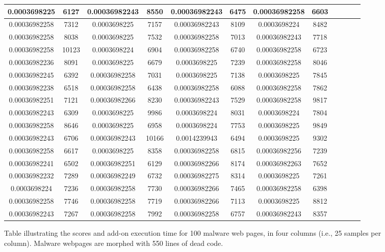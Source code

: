 \begin{figure}[h]
\begin{tabular}{|c|c|c|c|c|c|c|c|c|c|c|c|}
\midrule
0.0003698225&6127&0.00036982243&8550&0.00036982243&6475&0.00036982258&6603\\
\midrule
0.00036982258&7312&0.0003698225&7157&0.00036982243&8109&0.0003698224&8482\\
\midrule
0.00036982258&8038&0.0003698225&7532&0.00036982258&7013&0.00036982243&7718\\
\midrule
0.00036982258&10123&0.0003698224&6904&0.00036982258&6740&0.00036982258&6723\\
\midrule
0.00036982236&8091&0.0003698225&6679&0.0003698225&7239&0.00036982258&8046\\
\midrule
0.00036982245&6392&0.00036982258&7031&0.0003698225&7138&0.0003698225&7845\\
\midrule
0.00036982238&6518&0.00036982258&6438&0.00036982258&6088&0.00036982258&7862\\
\midrule
0.00036982251&7121&0.00036982266&8230&0.00036982243&7529&0.00036982258&9817\\
\midrule
0.00036982243&6309&0.0003698225&9986&0.0003698224&8031&0.0003698224&7804\\
\midrule
0.00036982258&8646&0.0003698225&6958&0.0003698224&7753&0.0003698225&9849\\
\midrule
0.00036982243&6706&0.00036982243&10166&0.0014239943&6494&0.0003698225&9302\\
\midrule
0.00036982258&6617&0.0003698225&8358&0.00036982258&6815&0.00036982256&7239\\
\midrule
0.00036982241&6502&0.00036982251&6129&0.00036982266&8174&0.00036982263&7652\\
\midrule
0.00036982232&7289&0.00036982249&6732&0.00036982275&8314&0.0003698225&7261\\
\midrule
0.0003698224&7236&0.00036982258&7730&0.00036982266&7465&0.00036982258&6398\\
\midrule
0.00036982258&7746&0.00036982258&7719&0.00036982266&7113&0.0003698225&8812\\
\midrule
0.00036982243&7267&0.00036982258&7992&0.00036982258&6757&0.00036982243&8357\\
\midrule
\end{tabular}
    \caption[Scores table of malware web pages]{Table illustrating the scores and add-on execution time for 100 malware web pages, in four columns (i.e., 25 samples per column). Malware webpages are morphed with 550 lines of dead code. }
    \label{fig:m500table}
\end{figure}

